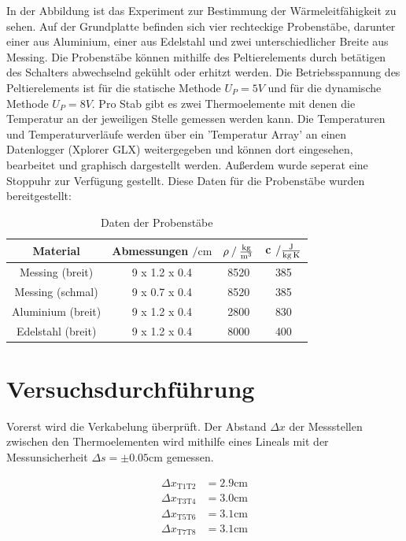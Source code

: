 In der Abbildung ist das Experiment zur Bestimmung der Wärmeleitfähigkeit zu sehen.
Auf der Grundplatte befinden sich vier rechteckige Probenstäbe, darunter einer aus Aluminium, einer aus Edelstahl und zwei unterschiedlicher Breite aus Messing.
Die Probenstäbe können mithilfe des Peltierelements durch betätigen des Schalters abwechselnd gekühlt oder erhitzt werden.
Die Betriebsspannung des Peltierelements ist für die statische Methode $U_P = 5V$ und für die dynamische Methode $U_P = 8V$.
Pro Stab gibt es zwei Thermoelemente mit denen die Temperatur an der jeweiligen Stelle gemessen werden kann.
Die Temperaturen und Temperaturverläufe werden über ein 'Temperatur Array' an einen Datenlogger (Xplorer GLX) weitergegeben und können dort eingesehen, bearbeitet und graphisch dargestellt werden.
Außerdem wurde seperat eine Stoppuhr zur Verfügung gestellt.
Diese Daten für die Probenstäbe wurden bereitgestellt:

\begin{table}
\centering
\begin{tabular}{c c c c }
\toprule
{Material} & Abmessungen $\mathbin{/} \si{\centi\meter}$ &{$ \rho \mathbin{/} \si[per-mode=fraction]{\kilo\gram\per\cubic\meter} $} & {c $ \mathbin{/} \si[per-mode=fraction]{\joule\per\kilo\gram\per\kelvin} $} \\
\midrule
Messing (breit)   & 9 x 1.2 x 0.4 & 8520 & 385 \\
Messing (schmal)  & 9 x 0.7 x 0.4 & 8520 & 385 \\
Aluminium (breit) & 9 x 1.2 x 0.4 & 2800 & 830 \\
Edelstahl (breit) & 9 x 1.2 x 0.4 & 8000 & 400 \\
\bottomrule
\end{tabular}
\caption{Daten der Probenstäbe}
\label{tab:probenstaebe}
\end{table}

\section{Versuchsdurchführung}
Vorerst wird die Verkabelung überprüft.                                                                                                                                                                                    
Der Abstand $\Delta x$ der Messstellen zwischen den Thermoelementen wird mithilfe eines Lineals mit der Messunsicherheit $\Delta s = \pm 0.05 \si{\centi\meter}$ gemessen.

\begin{align}
    \Delta x_\text{T1T2} &= 2.9 \si{\centi\meter}\\
    \Delta x_\text{T3T4} &= 3.0 \si{\centi\meter}\\
    \Delta x_\text{T5T6} &= 3.1 \si{\centi\meter}\\
    \Delta x_\text{T7T8} &= 3.1 \si{\centi\meter}\\
 \end{align}

